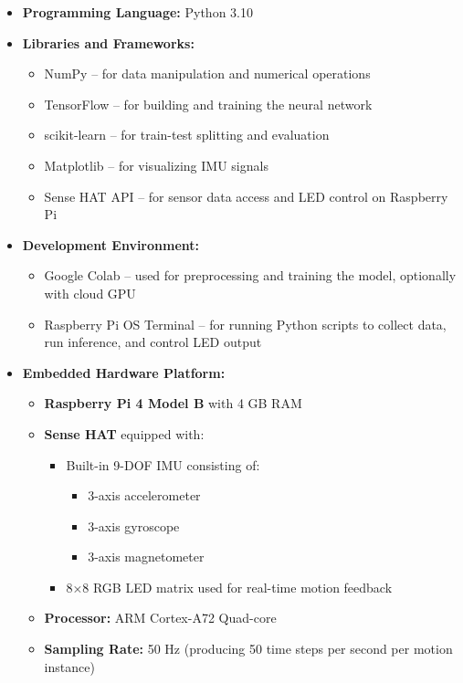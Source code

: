 \documentclass[a4paper,12pt]{article}
\begin{document}
\begin{itemize}
    \item \textbf{Programming Language:} Python 3.10

    \item \textbf{Libraries and Frameworks:}
    \begin{itemize}
        \item NumPy – for data manipulation and numerical operations
        \item TensorFlow – for building and training the neural network
        \item scikit-learn – for train-test splitting and evaluation
        \item Matplotlib – for visualizing IMU signals
        \item Sense HAT API – for sensor data access and LED control on Raspberry Pi
    \end{itemize}

    \item \textbf{Development Environment:}
    \begin{itemize}
        \item Google Colab – used for preprocessing and training the model, optionally with cloud GPU
        \item Raspberry Pi OS Terminal – for running Python scripts to collect data, run inference, and control LED output
    \end{itemize}

    \item \textbf{Embedded Hardware Platform:}
    \begin{itemize}
        \item \textbf{Raspberry Pi 4 Model B} with 4 GB RAM
        \item \textbf{Sense HAT} equipped with:
        \begin{itemize}
            \item Built-in 9-DOF IMU consisting of:
            \begin{itemize}
                \item 3-axis accelerometer
                \item 3-axis gyroscope
                \item 3-axis magnetometer
            \end{itemize}
            \item 8×8 RGB LED matrix used for real-time motion feedback
        \end{itemize}
        \item \textbf{Processor:} ARM Cortex-A72 Quad-core
        \item \textbf{Sampling Rate:} 50 Hz (producing 50 time steps per second per motion instance)
    \end{itemize}
\end{itemize}
\end{document}
